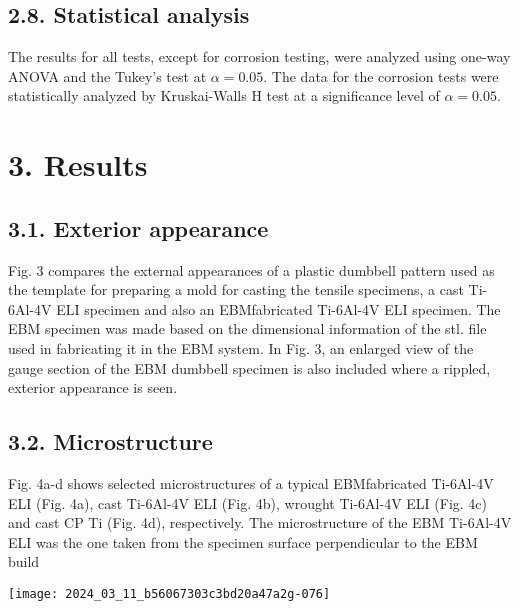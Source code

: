 \documentclass[10pt]{article}
\begin{document}
\subsection*{2.8. Statistical analysis}
The results for all tests, except for corrosion testing, were analyzed using one-way ANOVA and the Tukey's test at $\alpha=0.05$. The data for the corrosion tests were statistically analyzed by Kruskai-Walls $\mathrm{H}$ test at a significance level of $\alpha=0.05$.

\section*{3. Results}
\subsection*{3.1. Exterior appearance}
Fig. 3 compares the external appearances of a plastic dumbbell pattern used as the template for preparing a mold for casting the tensile specimens, a cast Ti-6Al-4V ELI specimen and also an EBMfabricated Ti-6Al-4V ELI specimen. The EBM specimen was made based on the dimensional information of the stl. file used in fabricating it in the EBM system. In Fig. 3, an enlarged view of the gauge section of the EBM dumbbell specimen is also included where a rippled, exterior appearance is seen.

\subsection*{3.2. Microstructure}
Fig. 4a-d shows selected microstructures of a typical EBMfabricated Ti-6Al-4V ELI (Fig. 4a), cast Ti-6Al-4V ELI (Fig. 4b), wrought Ti-6Al-4V ELI (Fig. 4c) and cast CP Ti (Fig. 4d), respectively. The microstructure of the EBM Ti-6Al-4V ELI was the one taken from the specimen surface perpendicular to the EBM build

\begin{center}
\texttt{[image: 2024\_03\_11\_b56067303c3bd20a47a2g-076]}
\end{center}
\end{document}
